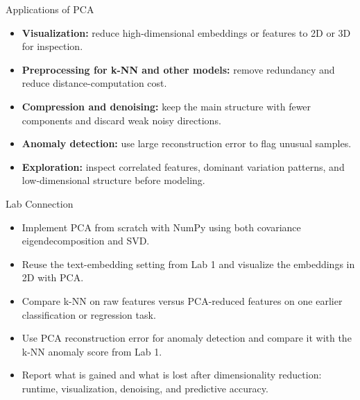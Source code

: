 \begin{frame}{Applications of PCA}
\begin{itemize}
  \item \textbf{Visualization:} reduce high-dimensional embeddings or features to 2D or 3D for inspection.
  \pause
  \item \textbf{Preprocessing for k-NN and other models:} remove redundancy and reduce distance-computation cost.
  \pause
  \item \textbf{Compression and denoising:} keep the main structure with fewer components and discard weak noisy directions.
  \pause
  \item \textbf{Anomaly detection:} use large reconstruction error to flag unusual samples.
  \pause
  \item \textbf{Exploration:} inspect correlated features, dominant variation patterns, and low-dimensional structure before modeling.
\end{itemize}
\end{frame}

\begin{frame}{Lab Connection}
\begin{itemize}
  \item Implement PCA from scratch with NumPy using both covariance eigendecomposition and SVD.
  \item Reuse the text-embedding setting from Lab 1 and visualize the embeddings in 2D with PCA.
  \item Compare k-NN on raw features versus PCA-reduced features on one earlier classification or regression task.
  \item Use PCA reconstruction error for anomaly detection and compare it with the k-NN anomaly score from Lab 1.
  \item Report what is gained and what is lost after dimensionality reduction: runtime, visualization, denoising, and predictive accuracy.
\end{itemize}
\end{frame}
